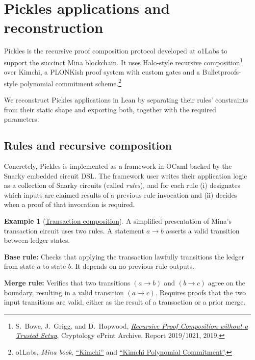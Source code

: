 \documentclass[11pt,a4paper]{article}
\theoremstyle{definition}
\newtheorem{example}{Example}[section]
\theoremstyle{insetstatement}
\begin{document}
\section{Pickles applications and reconstruction}
\label{sec:pickles-applications}

Pickles is the recursive proof composition protocol developed at o1Labs to
support the succinct Mina blockchain. It uses Halo-style recursive
composition\footnote{S.~Bowe, J.~Grigg, and D.~Hopwood,
  \href{https://eprint.iacr.org/2019/1021}{\emph{Recursive Proof Composition without a Trusted Setup}},
  Cryptology ePrint Archive, Report 2019/1021, 2019.}
over Kimchi, a PLONKish proof system with custom gates and a Bulletproofs-style
polynomial commitment scheme.\footnote{o1Labs, \emph{Mina book},
  \href{https://o1-labs.github.io/proof-systems/specs/kimchi/}{\textquotedblleft Kimchi\textquotedblright} and
  \href{https://o1-labs.github.io/proof-systems/specs/poly-commitment/}{\textquotedblleft Kimchi Polynomial Commitment\textquotedblright}.}

We reconstruct Pickles applications in Lean by separating their rules'
constraints from their static shape and exporting both, together with the
required parameters.

\subsection{Rules and recursive composition}
\label{sec:rules-composition}

Concretely, Pickles is implemented as a framework in OCaml backed by the Snarky
embedded circuit DSL. The framework user writes their application logic as a
collection of Snarky circuits (called \emph{rules}), and for each rule
(i) designates which inputs are claimed results of a previous rule invocation
and (ii) decides when a proof of that invocation is required.

\begin{example}[\href{https://github.com/l-adic/snarky/blob/main/packages/example/src/Snarky/Example/Transaction/Checked.purs\#L111-L165}{Transaction composition}]
A simplified presentation of Mina's transaction circuit uses two rules.
A statement $a \to b$ asserts a valid transition between ledger states.

\textup{\textbf{Base rule:}} Checks that applying the transaction lawfully transitions the
ledger from state $a$ to state $b$. It depends on no previous rule outputs.

\textup{\textbf{Merge rule:}} Verifies that two transitions $(a \to b)$ and $(b \to c)$
agree on the boundary, resulting in a valid transition $(a \to c)$.
Requires proofs that the two input transitions are valid, either as the
result of a transaction or a prior merge.

\end{example}
\end{document}
